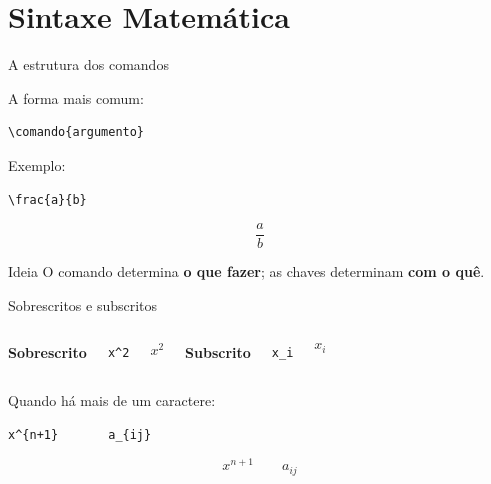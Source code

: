\documentclass[aspectratio=169,xcolor=dvipsnames]{beamer}
\begin{document}

\section{Sintaxe Matemática}

\begin{frame}[fragile]{A estrutura dos comandos}

    A forma mais comum:

\begin{lstlisting}
\comando{argumento}
\end{lstlisting}

    Exemplo:

\begin{lstlisting}
\frac{a}{b}
\end{lstlisting}

    \[
        \frac{a}{b}
    \]

    \begin{alertblock}{Ideia}
        O comando determina \textbf{o que fazer}; as chaves determinam \textbf{com o quê}.
    \end{alertblock}

\end{frame}

\begin{frame}[fragile]{Sobrescritos e subscritos}

    \begin{columns}


        \textbf{Sobrescrito}

\begin{lstlisting}
x^2
\end{lstlisting}

        \[
            x^2
        \]


        \textbf{Subscrito}

\begin{lstlisting}
x_i
\end{lstlisting}

        \[
            x_i
        \]

    \end{columns}

    \vspace{0.5cm}

    Quando há mais de um caractere:

\begin{lstlisting}
x^{n+1}       a_{ij}
\end{lstlisting}

\[
    x^{n+1}
    \qquad
    a_{ij}
\]

\end{frame}
\end{document}

